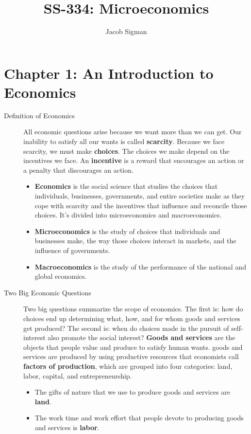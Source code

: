 \documentclass{article}
\title{SS-334: Microeconomics}
\author{Jacob Sigman}
\date{}
\begin{document}
\maketitle
\section*{Chapter 1: An Introduction to Economics}
\begin{description}
    \item [Definition of Economics] All economic questions arise because we want more than we can get. Our inability to satisfy all our wants is called \textbf{scarcity}. Because we face scarcity, we must make \textbf{choices}. The choices we make depend on the incentives we face. An \textbf{incentive} is a reward that encourages an action or a penalty that discourages an action.
    \begin{itemize}
        \item \textbf{Economics} is the social science that studies the choices that individuals, businesses, governments, and entire societies make as they cope with scarcity and the incentives that influence and reconcile those choices. It's divided into microeconomics and macroeconomics.
        \item \textbf{Microeconomics} is the study of choices that individuals and businesses make, the way those choices interact in markets, and the influence of governments.
        \item \textbf{Macroeconomics} is the study of the performance of the national and global economics.
    \end{itemize}
    \item [Two Big Economic Questions] Two big questions summarize the scope of economics. The first is: how do choices end up determining what, how, and for whom goods and services get produced? The second is: when do choices made in the pursuit of self-interest also promote the social interest? \textbf{Goods and services} are the objects that people value and produce to satisfy human wants. goods and services are produced by using productive resources that economists call \textbf{factors of production}, which are grouped into four categories: land, labor, capital, and entrepreneurship.
    \begin{itemize}
        \item The gifts of nature that we use to produce goods and services are \textbf{land}.
        \item The work time and work effort that people devote to producing goods and services is \textbf{labor}.

\end{itemize}
\end{description}
\end{document}
